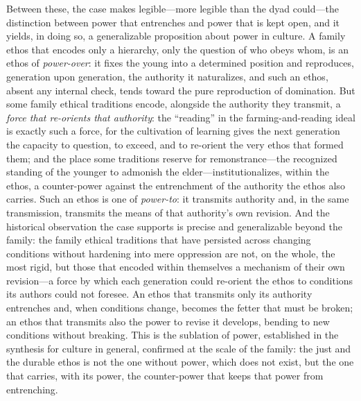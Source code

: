 Between these, the case makes legible---more legible than the dyad could---the distinction between power that entrenches and power that is kept open, and it yields, in doing so, a generalizable proposition about power in culture. A family ethos that encodes only a hierarchy, only the question of who obeys whom, is an ethos of \emph{power-over}: it fixes the young into a determined position and reproduces, generation upon generation, the authority it naturalizes, and such an ethos, absent any internal check, tends toward the pure reproduction of domination. But some family ethical traditions encode, alongside the authority they transmit, a \emph{force that re-orients that authority}: the ``reading'' in the farming-and-reading ideal is exactly such a force, for the cultivation of learning gives the next generation the capacity to question, to exceed, and to re-orient the very ethos that formed them; and the place some traditions reserve for remonstrance---the recognized standing of the younger to admonish the elder---institutionalizes, within the ethos, a counter-power against the entrenchment of the authority the ethos also carries. Such an ethos is one of \emph{power-to}: it transmits authority and, in the same transmission, transmits the means of that authority's own revision. And the historical observation the case supports is precise and generalizable beyond the family: the family ethical traditions that have persisted across changing conditions without hardening into mere oppression are not, on the whole, the most rigid, but those that encoded within themselves a mechanism of their own revision---a force by which each generation could re-orient the ethos to conditions its authors could not foresee. An ethos that transmits only its authority entrenches and, when conditions change, becomes the fetter that must be broken; an ethos that transmits also the power to revise it develops, bending to new conditions without breaking. This is the sublation of power, established in the synthesis for culture in general, confirmed at the scale of the family: the just and the durable ethos is not the one without power, which does not exist, but the one that carries, with its power, the counter-power that keeps that power from entrenching.

